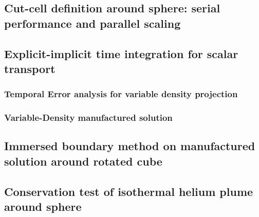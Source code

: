 \documentclass[12pt]{article}
\begin{document}
\subsection{Cut-cell definition around sphere: serial performance and parallel scaling}


\subsection{Explicit-implicit time integration for scalar transport}


\subsubsection{Temporal Error analysis for variable density projection}

\label{sec:saad_cc_temporal_error}




\subsubsection{Variable-Density manufactured solution}






\subsection{Immersed boundary method on manufactured solution around rotated cube}





\subsection{Conservation test of isothermal helium plume around sphere}
\end{document}
